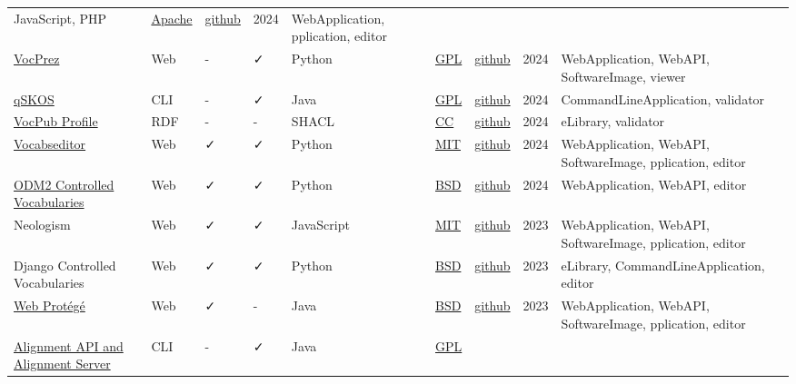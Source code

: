 \documentclass[
  DIV=10]{article}
\begin{document}
\begin{longtable}[]{@{}lllllllll@{}}
JavaScript, PHP & \href{https://spdx.org/licenses/Apache-2.0}{Apache} &
\href{https://github.com/NCOR-BR/onto4all}{github} & 2024 &
WebApplication, pplication, editor \\
\href{https://github.com/RDFLib/VocPrez}{VocPrez} & Web & - & ✓ & Python
& \href{https://spdx.org/licenses/GPL-3.0-or-later}{GPL} &
\href{https://github.com/RDFLib/VocPrez}{github} & 2024 &
WebApplication, WebAPI, SoftwareImage, viewer \\
\href{https://github.com/cmader/qSKOS/}{qSKOS} & CLI & - & ✓ & Java &
\href{https://spdx.org/licenses/GPL-3.0-or-later}{GPL} &
\href{https://github.com/cmader/qSKOS/}{github} & 2024 &
CommandLineApplication, validator \\
\href{https://surroundaustralia.github.io/vocpub-profile/profile.html}{VocPub
Profile} & RDF & - & - & SHACL &
\href{https://spdx.org/licenses/CC-BY-4.0}{CC} &
\href{https://github.com/AGLDWG/vocpub-profile/}{github} & 2024 &
eLibrary, validator \\
\href{https://vocabseditor.acdh.oeaw.ac.at/}{Vocabseditor} & Web & ✓ & ✓
& Python & \href{https://spdx.org/licenses/MIT}{MIT} &
\href{https://github.com/acdh-oeaw/vocabseditor}{github} & 2024 &
WebApplication, WebAPI, SoftwareImage, pplication, editor \\
\href{http://vocabulary.odm2.org/}{ODM2 Controlled Vocabularies} & Web &
✓ & ✓ & Python & \href{https://spdx.org/licenses/BSD-3-Clause}{BSD} &
\href{https://github.com/ODM2/ODM2ControlledVocabularies}{github} & 2024
& WebApplication, WebAPI, editor \\
Neologism & Web & ✓ & ✓ & JavaScript &
\href{https://spdx.org/licenses/MIT}{MIT} &
\href{https://github.com/Semantic-Society/Neologism}{github} & 2023 &
WebApplication, WebAPI, SoftwareImage, pplication, editor \\
Django Controlled Vocabularies & Web & ✓ & ✓ & Python &
\href{https://spdx.org/licenses/BSD-3-Clause}{BSD} &
\href{https://github.com/unt-libraries/django-controlled-vocabularies}{github}
& 2023 & eLibrary, CommandLineApplication, editor \\
\href{https://protegewiki.stanford.edu/wiki/WebProtege}{Web Protégé} &
Web & ✓ & - & Java & \href{https://spdx.org/licenses/BSD-3-Clause}{BSD}
& \href{https://github.com/protegeproject/webprotege}{github} & 2023 &
WebApplication, WebAPI, SoftwareImage, pplication, editor \\
\href{https://moex.gitlabpages.inria.fr/alignapi/}{Alignment API and
Alignment Server} & CLI & - & ✓ & Java &
\href{https://spdx.org/licenses/GPL-3.0-or-later}{GPL} &

\end{longtable}
\end{document}
